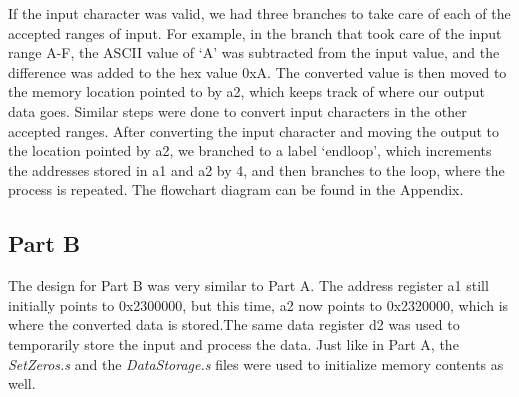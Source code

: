 \documentclass[letterpaper]{article}
\begin{document}
    If the input character was valid, we had three branches to take care of each
    of the accepted ranges of input. For example, in the branch that took care of the
    input range A-F, the ASCII value of `A' was subtracted from the input value, and
    the difference was added to the hex value 0xA. The converted value is then moved
    to the memory location pointed to by a2, which keeps track of where our output data goes.
    Similar steps were done to convert input characters in the other accepted ranges.
    After converting the input character and moving the output to the location pointed by a2,
    we branched to a label `endloop', which increments the addresses stored in a1 and a2 by 4,
    and then branches to the loop, where the process is repeated. The flowchart diagram can
    be found in the Appendix.





  \subsection{Part B}
    The design for Part B was very similar to Part A. The address register a1 still
    initially points to 0x2300000, but this time, a2 now points to 0x2320000, which is
    where the converted data is stored.The same data register d2 was used to temporarily
    store the input and process the data. Just like in Part A, the \textit{SetZeros.s} and the \textit{DataStorage.s} files
    were used to initialize memory contents as well.
\end{document}
